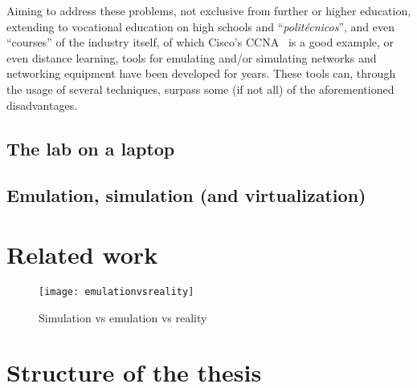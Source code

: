 Aiming to address these problems, not exclusive from further or higher education, extending to vocational education on high schools and ``\emph{politécnicos}'', and even ``courses'' of the industry itself, of which Cisco's CCNA~\cite{ccna} is a good example, or even distance learning, tools for emulating and/or simulating networks and networking equipment have been developed for years. %
These tools can, through the usage of several techniques, surpass some (if not all) of the aforementioned disadvantages.

\subsection{The lab on a laptop}
\label{subsec:replacingthelab}


\subsection{Emulation, simulation (and virtualization)}
\label{subsec:emulsimvirt}



\section{Related work}
\label{sec:relatedwork}







\begin{figure}
  \centering
  \texttt{[image: emulationvsreality]}
  \caption{Simulation vs emulation vs reality}
  \label{fig:emulationvsreality}
\end{figure}


\section{Structure of the thesis}
\label{sec:structure}


